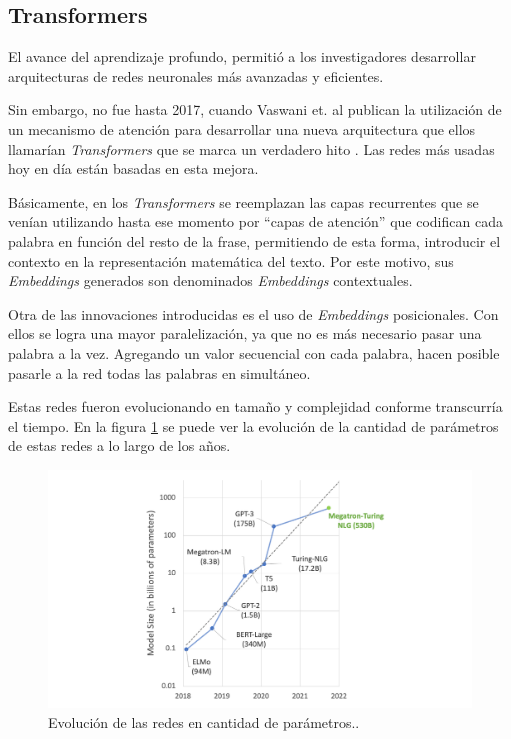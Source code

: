 \subsection{Transformers}

El avance del aprendizaje profundo, permitió a los investigadores desarrollar arquitecturas de redes neuronales más avanzadas y eficientes. 

Sin embargo, no fue hasta 2017, cuando Vaswani et. al publican la utilización de un mecanismo de atención para desarrollar una nueva arquitectura que ellos llamarían \textit{Transformers} que se marca un verdadero hito \citep{ARTICLE:5}. Las redes más usadas hoy en día están basadas en esta mejora.

Básicamente, en los \textit{Transformers} se reemplazan las capas recurrentes que se venían utilizando hasta ese momento por ``capas de atención'' que codifican cada palabra en función del resto de la frase, permitiendo de esta forma, introducir el contexto en la representación matemática del texto. Por este motivo, sus \textit{Embeddings} generados son denominados \textit{Embeddings} contextuales.

Otra de las innovaciones introducidas es el uso de \textit{Embeddings} posicionales. Con ellos se logra una mayor paralelización, ya que no es más necesario pasar una palabra a la vez. Agregando un valor secuencial con cada palabra, hacen posible pasarle a la red todas las palabras en simultáneo.

Estas redes fueron evolucionando en tamaño y complejidad conforme transcurría el tiempo. En la figura \ref{fig:transformers} se puede ver la evolución de la cantidad de parámetros de estas redes a lo largo de los años.

\begin{figure}[htbp]
	\centering
	\includegraphics[width=1\textwidth]{./Figures/transformers.png}
	\caption{Evolución de las redes en cantidad de parámetros.\protect\footnotemark.}
	\label{fig:transformers}
\end{figure}

